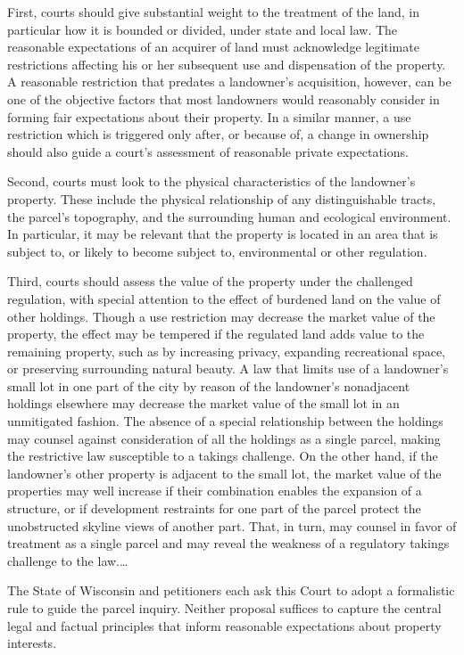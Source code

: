 First, courts should give substantial weight to the treatment of the land, in
particular how it is bounded or divided, under state and local law. The
reasonable expectations of an acquirer of land must acknowledge legitimate
restrictions affecting his or her subsequent use and dispensation of the
property. A reasonable restriction that predates a landowner's acquisition,
however, can be one of the objective factors that most landowners would
reasonably consider in forming fair expectations about their property. In a
similar manner, a use restriction which is triggered only after, or because of,
a change in ownership should also guide a court's assessment of reasonable
private expectations.

Second, courts must look to the physical characteristics of the landowner's
property. These include the physical relationship of any distinguishable tracts,
the parcel's topography, and the surrounding human and ecological environment.
In particular, it may be relevant that the property is located in an area that
is subject to, or likely to become subject to, environmental or other
regulation.

Third, courts should assess the value of the property under the challenged
regulation, with special attention to the effect of burdened land on the value
of other holdings. Though a use restriction may decrease the market value of the
property, the effect may be tempered if the regulated land adds value to the
remaining property, such as by increasing privacy, expanding recreational space,
or preserving surrounding natural beauty. A law that limits use of a landowner's
small lot in one part of the city by reason of the landowner's nonadjacent
holdings elsewhere may decrease the market value of the small lot in an
unmitigated fashion. The absence of a special relationship between the holdings
may counsel against consideration of all the holdings as a single parcel, making
the restrictive law susceptible to a takings challenge. On the other hand, if
the landowner's other property is adjacent to the small lot, the market value of
the properties may well increase if their combination enables the expansion of a
structure, or if development restraints for one part of the parcel protect the
unobstructed skyline views of another part. That, in turn, may counsel in favor
of treatment as a single parcel and may reveal the weakness of a regulatory
takings challenge to the law.\ldots



The State of Wisconsin and petitioners each ask this Court to adopt a
formalistic rule to guide the parcel inquiry. Neither proposal suffices to
capture the central legal and factual principles that inform reasonable
expectations about property interests.

